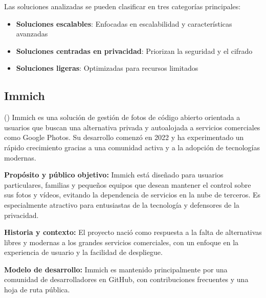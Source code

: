 Las soluciones analizadas se pueden clasificar en tres categorías principales:
\begin{itemize}
    \item \textbf{Soluciones escalables}: Enfocadas en escalabilidad y características avanzadas
    \item \textbf{Soluciones centradas en privacidad}: Priorizan la seguridad y el cifrado
    \item \textbf{Soluciones ligeras}: Optimizadas para recursos limitados
\end{itemize}


\subsection{Immich}

(\cite{immich-documentation}) Immich es una solución de gestión de fotos de código abierto orientada a usuarios que buscan una alternativa privada y autoalojada a servicios comerciales como Google Photos. Su desarrollo comenzó en 2022 y ha experimentado un rápido crecimiento gracias a una comunidad activa y a la adopción de tecnologías modernas.

\textbf{Propósito y público objetivo:} Immich está diseñado para usuarios particulares, familias y pequeños equipos que desean mantener el control sobre sus fotos y vídeos, evitando la dependencia de servicios en la nube de terceros. Es especialmente atractivo para entusiastas de la tecnología y defensores de la privacidad.

\textbf{Historia y contexto:} El proyecto nació como respuesta a la falta de alternativas libres y modernas a los grandes servicios comerciales, con un enfoque en la experiencia de usuario y la facilidad de despliegue.

\textbf{Modelo de desarrollo:} Immich es mantenido principalmente por una comunidad de desarrolladores en GitHub, con contribuciones frecuentes y una hoja de ruta pública.

